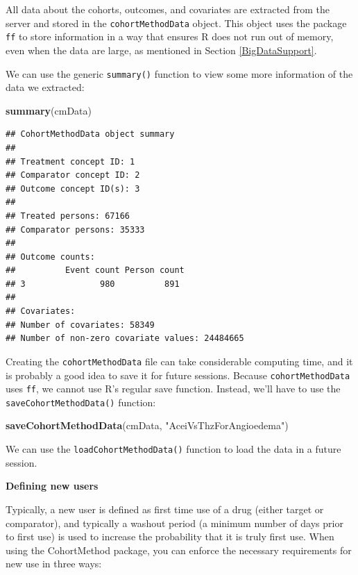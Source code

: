 \documentclass[11pt]{book}
\newenvironment{Shaded}{\begin{snugshade}}{\end{snugshade}}
\newcommand{\KeywordTok}[1]{\textcolor[rgb]{0.13,0.29,0.53}{\textbf{#1}}}
\newcommand{\NormalTok}[1]{#1}
\newcommand{\StringTok}[1]{\textcolor[rgb]{0.31,0.60,0.02}{#1}}
\theoremstyle{definition}
\theoremstyle{definition}
\theoremstyle{definition}
\theoremstyle{remark}
\begin{document}
All data about the cohorts, outcomes, and covariates are extracted from the server and stored in the \texttt{cohortMethodData} object. This object uses the package \texttt{ff} to store information in a way that ensures R does not run out of memory, even when the data are large, as mentioned in Section \ref{BigDataSupport}.

We can use the generic \texttt{summary()} function to view some more information of the data we extracted:

\begin{Shaded}
\begin{Highlighting}[]
\KeywordTok{summary}\NormalTok{(cmData)}
\end{Highlighting}
\end{Shaded}

\begin{verbatim}
## CohortMethodData object summary
## 
## Treatment concept ID: 1
## Comparator concept ID: 2
## Outcome concept ID(s): 3
## 
## Treated persons: 67166
## Comparator persons: 35333
## 
## Outcome counts:
##          Event count Person count
## 3               980          891
## 
## Covariates:
## Number of covariates: 58349
## Number of non-zero covariate values: 24484665
\end{verbatim}

Creating the \texttt{cohortMethodData} file can take considerable computing time, and it is probably a good idea to save it for future sessions. Because \texttt{cohortMethodData} uses \texttt{ff}, we cannot use R's regular save function. Instead, we'll have to use the \texttt{saveCohortMethodData()} function:

\begin{Shaded}
\begin{Highlighting}[]
\KeywordTok{saveCohortMethodData}\NormalTok{(cmData, }\StringTok{"AceiVsThzForAngioedema"}\NormalTok{)}
\end{Highlighting}
\end{Shaded}

We can use the \texttt{loadCohortMethodData()} function to load the data in a future session.

\textbf{Defining new users}

Typically, a new user is defined as first time use of a drug (either target or comparator), and typically a washout period (a minimum number of days prior to first use) is used to increase the probability that it is truly first use. When using the CohortMethod package, you can enforce the necessary requirements for new use in three ways:
\end{document}
